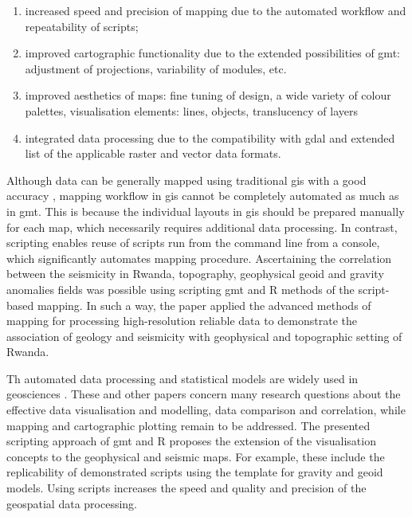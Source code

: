 \documentclass[myclassdoc,debug]{rjparticle}
\begin{document}
\begin{enumerate}
	\item increased speed and precision of mapping due to the automated workflow and repeatability of scripts; 
	\item improved cartographic functionality due to the extended possibilities of \ac{gmt}: adjustment of projections, variability of modules, etc.
	\item improved aesthetics of maps: fine tuning of design, a wide variety of colour palettes, visualisation elements: lines, objects, translucency of layers 
	\item integrated data processing due to the compatibility with \ac{gdal} and extended list of the applicable raster and vector data formats. 
\end{enumerate}

Although data can be generally mapped using traditional \ac{gis} with a good accuracy \cite{Mindje,Lemenkova2020e,Hategekimana}, mapping workflow in \ac{gis} cannot be completely automated as much as in \ac{gmt}. This is because the individual layouts in \ac{gis} should be prepared manually for each map, which necessarily requires additional data processing. In contrast, scripting enables reuse of scripts run from the command line from a console, which significantly automates mapping procedure. Ascertaining the correlation between the seismicity in Rwanda, topography, geophysical geoid and gravity anomalies fields was possible using scripting \ac{gmt} and R methods of the script-based mapping. In such a way, the paper applied the advanced methods of mapping for processing high-resolution reliable data to demonstrate the association of geology and seismicity with geophysical and topographic setting of Rwanda.

Th automated data processing and statistical models are widely used in geosciences \cite{Safari,Uwiduhaye2021a,Uwiduhaye2021b,Uwiduhaye2018,Lemenkov,Banerjee}. These and other papers concern many research questions about the effective data visualisation and modelling, data comparison and correlation, while mapping and cartographic plotting remain to be addressed. 
The presented scripting approach of \ac{gmt} and R proposes the extension of the visualisation concepts to the geophysical and seismic maps. For example, these include the replicability of demonstrated scripts using the template for gravity and geoid models. Using scripts increases the speed and quality and precision of the geospatial data processing. 
\end{document}
